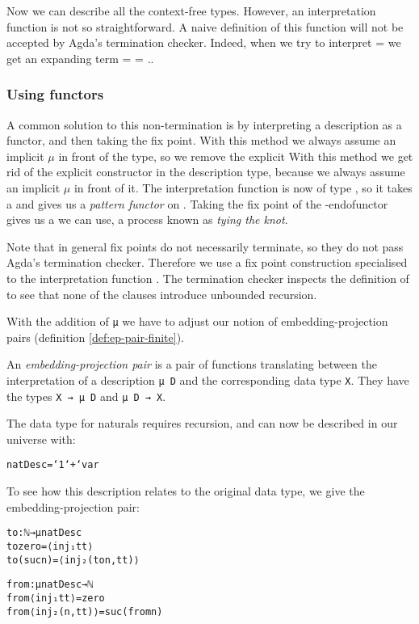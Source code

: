 Now we can describe all the context-free types.
However, an interpretation function  is not so
straightforward.
A naive definition of this function will not be accepted by Agda's
termination checker.
Indeed, when we try to interpret  =   
 we get an expanding term  
 =      = ..

\subsubsection{Using functors}\label{sec:lit-cft-single}

A common solution to this non-termination is by interpreting a
description as a functor, and then taking the fix point.
With this method we always assume an implicit $μ$ in front of
the type, so we remove the explicit 
With this method we get rid of the explicit  constructor in the
description type, because we always assume an implicit $μ$ in front of
it.
The interpretation function  is now of type  
  , so it takes a  and gives us a
\emph{pattern functor} on .
Taking the fix point of the -endofunctor gives us a 
we can use, a process known as \emph{tying the knot}.


Note that in general fix points do not necessarily terminate, so they
do not pass Agda's termination checker.
Therefore we use a fix point construction specialised to
the interpretation function .
The termination checker inspects the definition of  to see
that none of the clauses introduce unbounded recursion.

With the addition of \texttt{μ} we have to adjust our notion of
embedding-projection pairs (definition \ref{def:ep-pair-finite}).
\begin{definition}
  An \emph{embedding-projection pair} is a pair of functions
  translating between the interpretation of a description \texttt{μ D}
  and the corresponding data type \texttt{X}.
  They have the types \texttt{X → μ D} and \texttt{μ D → X}.
\end{definition}

\begin{example}
The data type for naturals requires recursion, and can now be
described in our universe with:

\begin{alltt}
natDesc = `1 `+ `var
\end{alltt}

To see how this description relates to the original data type, we give
the embedding-projection pair:

\begin{alltt}
to : ℕ → μ natDesc
to zero = ⟨ inj₁ tt ⟩
to (suc n) = ⟨ inj₂ (to n , tt) ⟩

from : μ natDesc → ℕ
from ⟨ inj₁ tt ⟩ = zero
from ⟨ inj₂ (n , tt) ⟩ = suc (from n)
\end{alltt}
\end{example}

